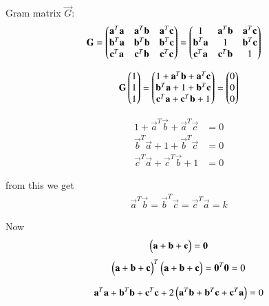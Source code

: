 \documentclass[journal]{IEEEtran}
\begin{document}
Gram matrix $\vec{G}$:
\begin{align}
    \mathbf{G} = \begin{pmatrix} \mathbf{a}^T \mathbf{a} & \mathbf{a}^T \mathbf{b} & \mathbf{a}^T \mathbf{c} \\ \mathbf{b}^T \mathbf{a} & \mathbf{b}^T \mathbf{b} & \mathbf{b}^T \mathbf{c} \\ \mathbf{c}^T \mathbf{a} & \mathbf{c}^T \mathbf{b} & \mathbf{c}^T \mathbf{c} \end{pmatrix} &= \begin{pmatrix} 1 & \mathbf{a}^T \mathbf{b} & \mathbf{a}^T \mathbf{c} \\ \mathbf{b}^T \mathbf{a} & 1 & \mathbf{b}^T \mathbf{c} \\ \mathbf{c}^T \mathbf{a} & \mathbf{c}^T \mathbf{b} & 1 \end{pmatrix}
\end{align}

\begin{align}
    \mathbf{G} \begin{pmatrix}1 \\ 1 \\ 1\end{pmatrix} = \begin{pmatrix}1 + \mathbf{a}^T \mathbf{b} + \mathbf{a}^T \mathbf{c} \\ \mathbf{b}^T \mathbf{a} + 1 + \mathbf{b}^T \mathbf{c} \\ \mathbf{c}^T \mathbf{a} + \mathbf{c}^T \mathbf{b} + 1 \end{pmatrix} = \begin{pmatrix}0 \\ 0 \\ 0\end{pmatrix}
\end{align}


\begin{align}
    1 + \vec{a}^T \vec{b} + \vec{a}^T \vec{c} &= 0 \label{eq:scalar1} \\
    \vec{b}^T \vec{a} + 1 + \vec{b}^T \vec{c} &= 0 \label{eq:scalar2} \\
    \vec{c}^T \vec{a} + \vec{c}^T \vec{b} + 1 &= 0 \label{eq:scalar3}
\end{align}

from this we get 
\begin{align}
    \vec{a}^T \vec{b} = \vec{b}^T \vec{c} = \vec{c}^T \vec{a} = k
\end{align}



Now
\begin{align}
    \begin{pmatrix}\mathbf{a} + \mathbf{b} + \mathbf{c}\end{pmatrix}&=\mathbf{0} \\
\end{align}
\begin{align}
    \begin{pmatrix}\mathbf{a} + \mathbf{b} + \mathbf{c}\end{pmatrix}^T \begin{pmatrix}\mathbf{a} + \mathbf{b} + \mathbf{c}\end{pmatrix} = \mathbf{0}^T \mathbf{0} = 0
\end{align}

\begin{align}
    \mathbf{a}^T \mathbf{a} + \mathbf{b}^T \mathbf{b} + \mathbf{c}^T \mathbf{c} + 2\begin{pmatrix}\mathbf{a}^T \mathbf{b} + \mathbf{b}^T \mathbf{c} + \mathbf{c}^T \mathbf{a}\end{pmatrix} = 0
\end{align}
\end{document}
